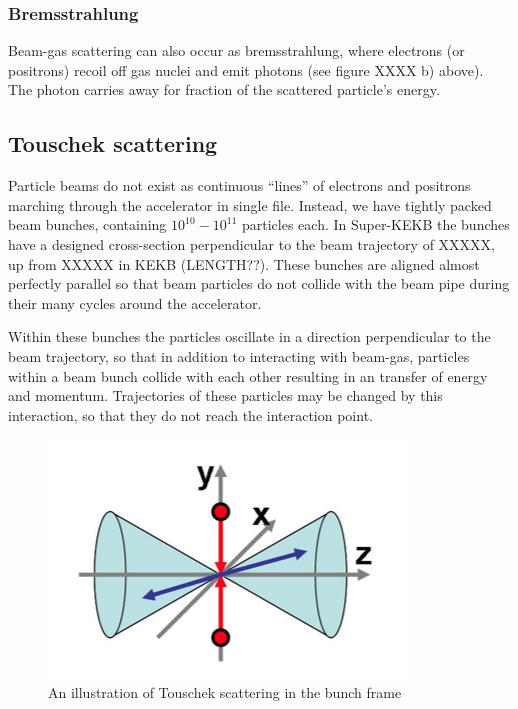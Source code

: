 \documentclass[12pt]{thesis}  %
\begin{document}
\subsubsection{Bremsstrahlung}

Beam-gas scattering can also occur as bremsstrahlung, where electrons (or positrons) recoil off gas nuclei and emit photons (see figure XXXX b) above). The photon carries away for fraction of the scattered particle's energy.


\subsection{Touschek scattering}

Particle beams do not exist as continuous ``lines'' of electrons and positrons marching through the accelerator in single file. Instead, we have tightly packed beam bunches, containing $10^{10} - 10^{11}$ particles each. In Super-KEKB the bunches have a designed cross-section perpendicular to the beam trajectory of XXXXX, up from XXXXX in KEKB (LENGTH??). These bunches are aligned almost perfectly parallel so that beam particles do not collide with the beam pipe during their many cycles around the accelerator.

Within these bunches the particles oscillate in a direction perpendicular to the beam trajectory, so that in addition to interacting with beam-gas, particles within a beam bunch collide with each other resulting in an transfer of energy and momentum. Trajectories of these particles may be changed by this interaction, so that they do not reach the interaction point. 

\begin{figure}[h]
\centering
\includegraphics[width=0.5\linewidth]{images/touschek-beam-frame.png}
\caption{An illustration of Touschek scattering in the bunch frame}
\label{fig:test2}
\end{figure}



\end{document}

